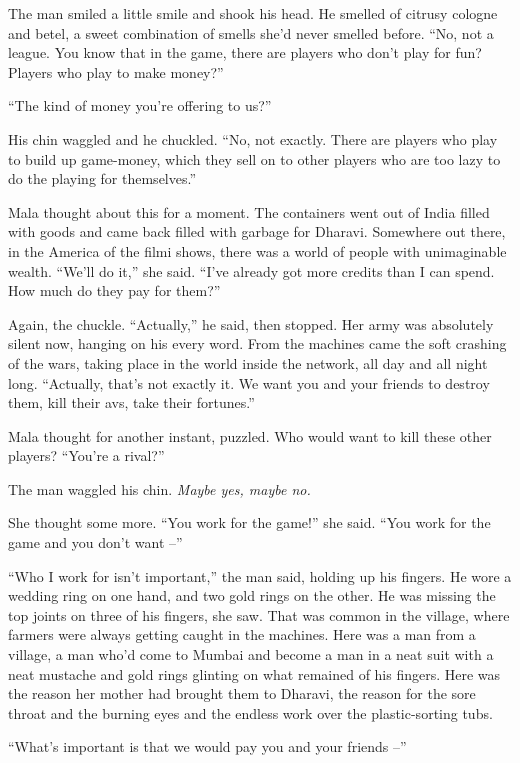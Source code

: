The man smiled a little smile and shook his head. He smelled of
citrusy cologne and betel, a sweet combination of smells she'd
never smelled before. ``No, not a league. You know that in the game,
there are players who don't play for fun? Players who play to make
money?''

``The kind of money you're offering to us?''

His chin waggled and he chuckled. ``No, not exactly. There are
players who play to build up game-money, which they sell on to
other players who are too lazy to do the playing for themselves.''

Mala thought about this for a moment. The containers went out of
India filled with goods and came back filled with garbage for
Dharavi. Somewhere out there, in the America of the filmi shows,
there was a world of people with unimaginable wealth. ``We'll do
it,'' she said. ``I've already got more credits than I can spend. How
much do they pay for them?''

Again, the chuckle. ``Actually,'' he said, then stopped. Her army was
absolutely silent now, hanging on his every word. From the machines
came the soft crashing of the wars, taking place in the world
inside the network, all day and all night long. ``Actually, that's
not exactly it. We want you and your friends to destroy them, kill
their avs, take their fortunes.''

Mala thought for another instant, puzzled. Who would want to kill
these other players? ``You're a rival?''

The man waggled his chin. \emph{Maybe yes, maybe no.}

She thought some more. ``You work for the game!'' she said. ``You work
for the game and you don't want --''

``Who I work for isn't important,'' the man said, holding up his
fingers. He wore a wedding ring on one hand, and two gold rings on
the other. He was missing the top joints on three of his fingers,
she saw. That was common in the village, where farmers were always
getting caught in the machines. Here was a man from a village, a
man who'd come to Mumbai and become a man in a neat suit with a
neat mustache and gold rings glinting on what remained of his
fingers. Here was the reason her mother had brought them to
Dharavi, the reason for the sore throat and the burning eyes and
the endless work over the plastic-sorting tubs.

``What's important is that we would pay you and your friends --''

